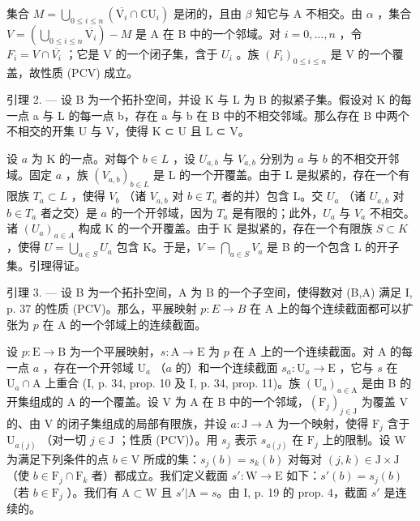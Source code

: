 集合 \(M = \bigcup_{0 \leqslant i \leqslant n} (\overline{\mathrm{V}_{i}} \cap \mathbb{C}\mathrm{U}_{i})\) 是闭的，且由 \(\beta\) 知它与 A 不相交。由 \(\alpha\) ，集合 \(V = (\bigcup_{0 \leqslant i \leqslant n} \overline{\mathrm{V}_{i}}) - M\) 是 A 在 B 中的一个邻域。对 \(i = 0, \ldots, n\) ，令 \(F_{i} = V \cap \overline{V_{i}}\) ；它是 V 的一个闭子集，含于 \(U_{i}\) 。族 \((F_{i})_{0 \leqslant i \leqslant n}\) 是 V 的一个覆盖，故性质 (PCV) 成立。

引理 2. --- 设 B 为一个拓扑空间，并设 K 与 L 为 B 的拟紧子集。假设对 K 的每一点 a 与 L 的每一点 b，存在 a 与 b 在 B 中的不相交邻域。那么存在 B 中两个不相交的开集 U 与 V，使得 K ⊂ U 且 L ⊂ V。

设 \(a\) 为 K 的一点。对每个 \(b \in L\) ，设 \(U_{a,b}\) 与 \(V_{a,b}\) 分别为 \(a\) 与 \(b\) 的不相交开邻域。固定 \(a\) ，族 \((V_{a,b})_{b \in L}\) 是 L 的一个开覆盖。由于 L 是拟紧的，存在一个有限族 \(T_a \subset L\) ，使得 \(V_b\) （诸 \(V_{a,b}\) 对 \(b \in T_a\) 者的并）包含 L。交 \(U_a\) （诸 \(U_{a,b}\) 对 \(b \in T_a\) 者之交）是 \(a\) 的一个开邻域，因为 \(T_a\) 是有限的；此外，\(U_a\) 与 \(V_a\) 不相交。诸 \((U_a)_{a \in A}\) 构成 K 的一个开覆盖。由于 K 是拟紧的，存在一个有限族 \(S \subset K\) ，使得 \(U = \bigcup_{a \in S} U_a\) 包含 K。于是，\(V = \bigcap_{a \in S} V_a\) 是 B 的一个包含 L 的开子集。引理得证。

引理 3. --- 设 B 为一个拓扑空间，A 为 B 的一个子空间，使得数对 (B,A) 满足 I, p. 37 的性质 (PCV)。那么，平展映射 \(p\colon E \to B\) 在 A 上的每个连续截面都可以扩张为 \(p\) 在 A 的一个邻域上的连续截面。

设 \(p \colon \mathrm{E} \to \mathrm{B}\) 为一个平展映射，\(s \colon \mathrm{A} \to \mathrm{E}\) 为 \(p\) 在 A 上的一个连续截面。对 A 的每一点 \(a\) ，存在一个开邻域 \(\mathrm{U}_a\) （\(a\) 的）和一个连续截面 \(s_a \colon \mathrm{U}_a \to \mathrm{E}\) ，它与 \(s\) 在 \(\mathrm{U}_a \cap \mathrm{A}\) 上重合 (I, p. 34, prop. 10 及 I, p. 34, prop. 11)。族 \((\mathrm{U}_a)_{a \in \mathrm{A}}\) 是由 B 的开集组成的 A 的一个覆盖。设 V 为 A 在 B 中的一个邻域，\((\mathrm{F}_j)_{j \in \mathrm{J}}\) 为覆盖 V 的、由 V 的闭子集组成的局部有限族，并设 \(a \colon \mathrm{J} \to \mathrm{A}\) 为一个映射，使得 \(\mathrm{F}_j\) 含于 \(\mathrm{U}_{a(j)}\) （对一切 \(j \in \mathrm{J}\) ；性质 (PCV)）。用 \(s_j\) 表示 \(s_{a(j)}\) 在 \(\mathrm{F}_j\) 上的限制。设 W 为满足下列条件的点 \(b \in \mathrm{V}\) 所成的集：\(s_j(b) = s_k(b)\) 对每对 \((j, k) \in \mathrm{J} \times \mathrm{J}\) （使 \(b \in \mathrm{F}_j \cap \mathrm{F}_k\) 者）都成立。我们定义截面 \(s' \colon \mathrm{W} \to \mathrm{E}\) 如下：\(s'(b) = s_j(b)\) （若 \(b \in \mathrm{F}_j\) ）。我们有 \(\mathrm{A} \subset \mathrm{W}\) 且 \(s' | \mathrm{A} = s\)。由 I, p. 19 的 prop. 4，截面 \(s'\) 是连续的。

